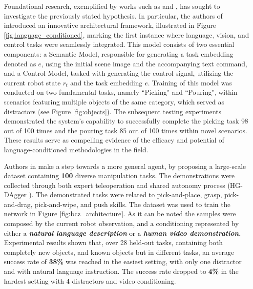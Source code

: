 \newline Foundational research, exemplified by works such as \cite{stepputtis2020language} and \cite{jang2022bc_z}, has sought to investigate the previously stated hypothesis. In particular, the authors of \cite{stepputtis2020language} introduced an innovative architectural framework, illustrated in Figure \ref{fig:language_conditioned}, marking the first instance where language, vision, and control tasks were seamlessly integrated. This model consists of two essential components: a Semantic Model, responsible for generating a task embedding denoted as $e$, using the initial scene image and the accompanying text command, and a Control Model, tasked with generating the control signal, utilizing the current robot state $r_{t}$ and the task embedding $e$.
Training of this model was conducted on two fundamental tasks, namely ``Picking" and ``Pouring", within scenarios featuring multiple objects of the same category, which served as distractors (see Figure \ref{fig:objects}). The subsequent testing experiments demonstrated the system's capability to successfully complete the picking task 98 out of 100 times and the pouring task 85 out of 100 times within novel scenarios. These results serve as compelling evidence of the efficacy and potential of language-conditioned methodologies in the field.

Authors in \cite{jang2022bc_z} make a step towards a more general agent, by proposing a large-scale dataset containing \textbf{100} diverse manipulation tasks. The demonstrations were collected through both expert teleoperation and shared autonomy process (HG-DAgger \cite{kelly2019hg_dagger}). The demonstrated tasks were related to pick-and-place, grasp, pick-and-drag, pick-and-wipe, and push skills. The dataset was used to train the network in Figure \ref{fig:bcz_architecture}. As it can be noted the samples were composed by the current robot observation, and a conditioning represented by either a \textit{\textbf{natural language description}} or a \textit{\textbf{human video demonstration}}.
Experimental results shown that, over 28 held-out tasks, containing both completely new objects, and known objects but in different tasks, an average success rate of \textbf{38\%} was reached in the easiest setting, with only one distractor and with natural language instruction. The success rate dropped to \textbf{4\%} in the hardest setting with 4 distractors and video conditioning.
